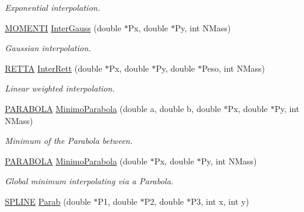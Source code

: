 \begin{DoxyCompactItemize}
\begin{DoxyCompactList}\small\item\em Exponential interpolation. \end{DoxyCompactList}\item 
\hyperlink{structMOMENTI}{M\+O\+M\+E\+N\+TI} \hyperlink{classMatematica_ae9688b8f498233bf332032c7dafc1982}{Inter\+Gauss} (double $\ast$Px, double $\ast$Py, int N\+Mass)\hypertarget{classMatematica_ae9688b8f498233bf332032c7dafc1982}{}\label{classMatematica_ae9688b8f498233bf332032c7dafc1982}

\begin{DoxyCompactList}\small\item\em Gaussian interpolation. \end{DoxyCompactList}\item 
\hyperlink{structRETTA}{R\+E\+T\+TA} \hyperlink{classMatematica_ad5a7658737a31da4e856a760a9beed80}{Inter\+Rett} (double $\ast$Px, double $\ast$Py, double $\ast$Peso, int N\+Mass)\hypertarget{classMatematica_ad5a7658737a31da4e856a760a9beed80}{}\label{classMatematica_ad5a7658737a31da4e856a760a9beed80}

\begin{DoxyCompactList}\small\item\em Linear weighted interpolation. \end{DoxyCompactList}\item 
\hyperlink{structPARABOLA}{P\+A\+R\+A\+B\+O\+LA} \hyperlink{classMatematica_a90a6e30254a3d26a422a173cdc46a823}{Minimo\+Parabola} (double a, double b, double $\ast$Px, double $\ast$Py, int N\+Mass)
\begin{DoxyCompactList}\small\item\em Minimum of the Parabola between. \end{DoxyCompactList}\item 
\hyperlink{structPARABOLA}{P\+A\+R\+A\+B\+O\+LA} \hyperlink{classMatematica_a0e0bcc6fadb562dde7298fa8119e7c4d}{Minimo\+Parabola} (double $\ast$Px, double $\ast$Py, int N\+Mass)\hypertarget{classMatematica_a0e0bcc6fadb562dde7298fa8119e7c4d}{}\label{classMatematica_a0e0bcc6fadb562dde7298fa8119e7c4d}

\begin{DoxyCompactList}\small\item\em Global minimum interpolating via a Parabola. \end{DoxyCompactList}\item 
\hyperlink{structSPLINE}{S\+P\+L\+I\+NE} \hyperlink{classMatematica_a0bf66137177a5078071d2da064fa3a72}{Parab} (double $\ast$P1, double $\ast$P2, double $\ast$P3, int x, int y)\hypertarget{classMatematica_a0bf66137177a5078071d2da064fa3a72}{}\label{classMatematica_a0bf66137177a5078071d2da064fa3a72}


\end{DoxyCompactItemize}

